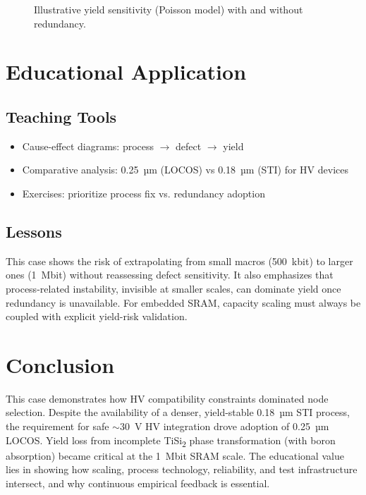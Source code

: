 \documentclass[conference]{IEEEtran}
\begin{document}
\begin{figure}[!t]
  \centering
  \caption{Illustrative yield sensitivity (Poisson model) with and without redundancy.}
  \label{fig:yield}
\end{figure}

\section{Educational Application}
\subsection{Teaching Tools}
\begin{itemize}
    \item Cause-effect diagrams: process $\rightarrow$ defect $\rightarrow$ yield
    \item Comparative analysis: 0.25~µm (LOCOS) vs 0.18~µm (STI) for HV devices
    \item Exercises: prioritize process fix vs. redundancy adoption
\end{itemize}

\subsection{Lessons}
This case shows the risk of extrapolating from small macros (500~kbit) to larger ones (1~Mbit) without reassessing defect sensitivity.  
It also emphasizes that process-related instability, invisible at smaller scales, can dominate yield once redundancy is unavailable.  
For embedded SRAM, capacity scaling must always be coupled with explicit yield-risk validation.

\section{Conclusion}
This case demonstrates how HV compatibility constraints dominated node selection.  
Despite the availability of a denser, yield-stable 0.18~µm STI process, the requirement for safe $\sim$30~V HV integration drove adoption of 0.25~µm LOCOS.  
Yield loss from incomplete TiSi\textsubscript{2} phase transformation (with boron absorption) became critical at the 1~Mbit SRAM scale.  
The educational value lies in showing how scaling, process technology, reliability, and test infrastructure intersect, and why continuous empirical feedback is essential.
\end{document}
